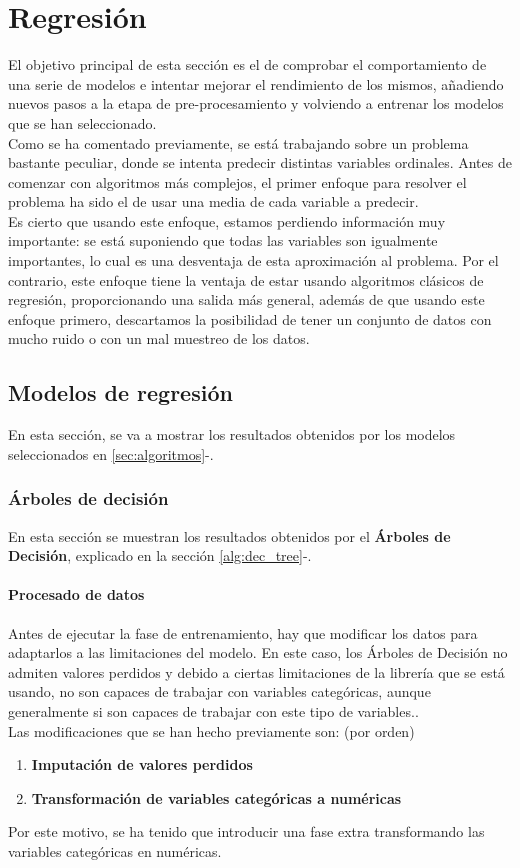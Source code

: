\chapter{Regresión}
\label{sec:reg}
El objetivo principal de esta sección es el de comprobar el comportamiento de una serie de modelos e intentar mejorar el rendimiento de los mismos, añadiendo nuevos pasos a la etapa de pre-procesamiento y volviendo a entrenar los modelos que se han seleccionado. \\
Como se ha comentado previamente, se está trabajando sobre un problema bastante peculiar, donde se intenta predecir distintas variables ordinales. Antes de comenzar con algoritmos más complejos, el primer enfoque para resolver el problema ha sido el de usar una media de cada variable a predecir. \\
Es cierto que usando este enfoque, estamos perdiendo información muy importante: se está suponiendo que todas las variables son igualmente importantes, lo cual es una desventaja de esta aproximación al problema.
Por el contrario, este enfoque tiene la ventaja de estar usando algoritmos clásicos de regresión, proporcionando una salida más general, además de que usando este enfoque primero, descartamos la posibilidad de tener un conjunto de datos con mucho ruido o con un mal muestreo de los datos.

\section{Modelos de regresión}
En esta sección, se va a mostrar los resultados obtenidos por los modelos seleccionados en \ref{sec:algoritmos}-.
\subsection{Árboles de decisión}
En esta sección se muestran los resultados obtenidos por el \textbf{Árboles de Decisión}, explicado en la sección \ref{alg:dec_tree}-.
\subsubsection*{Procesado de datos}
Antes de ejecutar la fase de entrenamiento, hay que modificar los datos para adaptarlos a las limitaciones del modelo. En este caso, los Árboles de Decisión no admiten valores perdidos y debido a ciertas limitaciones de la librería que se está usando, no son capaces de trabajar con variables categóricas, aunque generalmente si son capaces de trabajar con este tipo de variables..\\
Las modificaciones que se han hecho previamente son: (por orden)
\begin{enumerate}
	\item \textbf{Imputación de valores perdidos}
	\item \textbf{Transformación de variables categóricas a numéricas}
\end{enumerate}
Por este motivo, se ha tenido que introducir una fase extra transformando las variables categóricas en numéricas.

